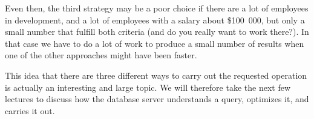 Even then, the third strategy may be a poor choice if there are a lot of employees in development, and a lot of employees with a salary about \$100~000, but only a small number that fulfill both criteria (and do you really want to work there?). In that case we have to do a lot of work to produce a small number of results when one of the other approaches might have been faster. 

This idea that there are three different ways to carry out the requested operation is actually an interesting and large topic. We will therefore take the next few lectures to discuss how the database server understands a query, optimizes it, and carries it out. 




